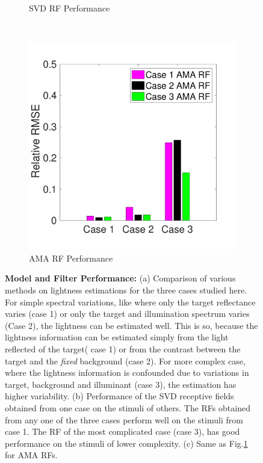 \documentclass{jov}
\begin{document}
\begin{figure}
\begin{subfigure}[b]{0.3 \textwidth}
	\caption{SVD RF Performance}
	\label{fig:SVDBAR}
    \end{subfigure}
    ~ %
        \begin{subfigure}[b]{0.3 \textwidth}
	\includegraphics[width=\textwidth]{../Figures/Figure8/Figure8_c.pdf}
	\caption{AMA RF Performance}
	\label{fig:AMABAR}
    \end{subfigure}
\caption{{\bf Model and Filter Performance:} (a) Comparison of various methods on lightness estimations for the three cases studied here. For simple spectral variations, like where only the target reflectance varies (case 1) or only the target and illumination spectrum varies (Case 2), the lightness can be estimated well. This is so, because the lightness information can be estimated simply from the light reflected of the target( case 1) or from the contrast between the target and the {\it fixed} background (case 2). For more complex case, where the lightness information is confounded due to variations in target, background and illuminant (case 3), the estimation has higher variability. (b) Performance of the SVD receptive fields obtained from one case on the stimuli of others. The RFs obtained from any one of the three cases perform well on the stimuli from case 1. The RF of the most complicated case (case 3), has good performance on the stimuli of lower complexity. (c) Same as Fig.\ref{fig:SVDBAR} for AMA RFs.}
 \label{fig:barGraphs}
\end{figure}
\end{document}
